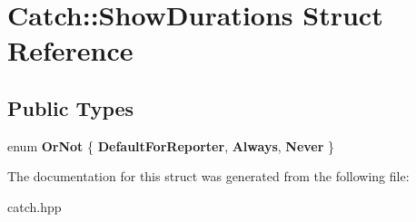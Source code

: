 \hypertarget{structCatch_1_1ShowDurations}{}\section{Catch\+:\+:Show\+Durations Struct Reference}
\label{structCatch_1_1ShowDurations}
\subsection*{Public Types}
\begin{DoxyCompactItemize}
\item 
\mbox{\label{structCatch_1_1ShowDurations_a82fa0174554187220c1eda175f122ee1}} 
enum {\bfseries Or\+Not} \{ {\bfseries Default\+For\+Reporter}, 
{\bfseries Always}, 
{\bfseries Never}
 \}
\end{DoxyCompactItemize}


The documentation for this struct was generated from the following file\+:\begin{DoxyCompactItemize}
\item 
catch.\+hpp\end{DoxyCompactItemize}
